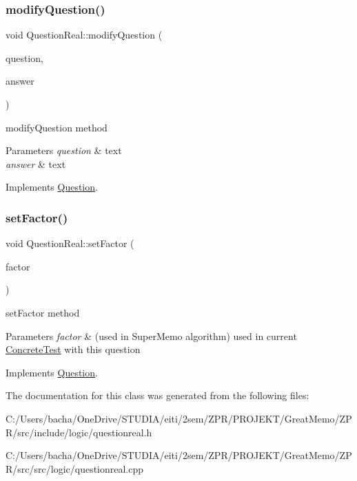 \subsubsection{\texorpdfstring{modify\+Question()}{modifyQuestion()}}
{\footnotesize\ttfamily void Question\+Real\+::modify\+Question (\begin{DoxyParamCaption}\item[{const Q\+String \&}]{question,  }\item[{const Q\+String \&}]{answer }\end{DoxyParamCaption})\hspace{0.3cm}{\ttfamily [virtual]}}



modify\+Question method 


\begin{DoxyParams}{Parameters}
{\em question} & text \\
\hline
{\em answer} & text \\
\hline
\end{DoxyParams}


Implements \hyperlink{class_question_ae3724056374e2e9160f4d7250241f9ab}{Question}.

\mbox{\label{class_question_real_a3c023bd8ecbba7ad59620e2216f0705a}} 
\subsubsection{\texorpdfstring{set\+Factor()}{setFactor()}}
{\footnotesize\ttfamily void Question\+Real\+::set\+Factor (\begin{DoxyParamCaption}\item[{double}]{factor }\end{DoxyParamCaption})\hspace{0.3cm}{\ttfamily [virtual]}}



set\+Factor method 


\begin{DoxyParams}{Parameters}
{\em factor} & (used in Super\+Memo algorithm) used in current \hyperlink{class_concrete_test}{Concrete\+Test} with this question \\
\hline
\end{DoxyParams}


Implements \hyperlink{class_question_ad5c8dfa4de5cce04fad3e31c0ccee1a0}{Question}.



The documentation for this class was generated from the following files\+:\begin{DoxyCompactItemize}
\item 
C\+:/\+Users/bacha/\+One\+Drive/\+S\+T\+U\+D\+I\+A/eiti/2sem/\+Z\+P\+R/\+P\+R\+O\+J\+E\+K\+T/\+Great\+Memo/\+Z\+P\+R/src/include/logic/questionreal.\+h\item 
C\+:/\+Users/bacha/\+One\+Drive/\+S\+T\+U\+D\+I\+A/eiti/2sem/\+Z\+P\+R/\+P\+R\+O\+J\+E\+K\+T/\+Great\+Memo/\+Z\+P\+R/src/src/logic/questionreal.\+cpp\end{DoxyCompactItemize}
